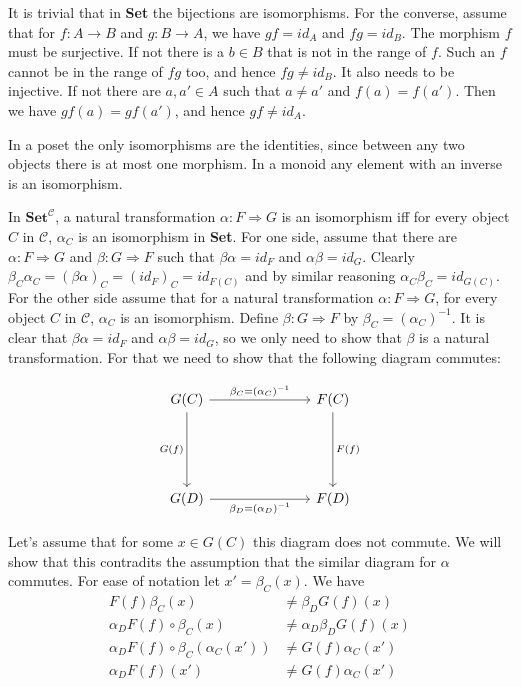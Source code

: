 It is trivial that in \textbf{Set} the bijections are isomorphisms. For the converse, assume that for $f:A\to B$ and $g:B\to A$, we have $gf=id_A$ and $fg=id_B$. The morphism $f$ must be surjective. If not there is a $b\in B$ that is not in the range of $f$. Such an $f$ cannot be in the range of $fg$ too, and hence $fg\neq id_B$. It also needs to be injective. If not there are $a,a'\in A$ such that $a\neq a'$ and $f(a)=f(a')$. Then we have $gf(a)=gf(a')$, and hence $gf\neq id_A$.

In a poset the only isomorphisms are the identities, since between any two objects there is at most one morphism. In a monoid any element with an inverse is an isomorphism.

In $\textbf{Set}^\mathcal{C}$, a natural transformation $\alpha:F\Rightarrow G$ is an isomorphism iff for every object $C$ in $\mathcal{C}$, $\alpha_C$ is an isomorphism in \textbf{Set}. For one side, assume that there are $\alpha:F\Rightarrow G$ and $\beta:G\Rightarrow F$ such that $\beta\alpha=id_F$ and $\alpha\beta=id_G$. Clearly $\beta_C\alpha_C=(\beta\alpha)_C=(id_F)_C=id_{F(C)}$ and by similar reasoning $\alpha_C\beta_C=id_{G(C)}$. For the other side assume that for a natural transformation $\alpha:F\Rightarrow G$, for every object $C$ in $\mathcal{C}$, $\alpha_C$ is an isomorphism. Define $\beta:G\Rightarrow F$ by $\beta_C=(\alpha_C)^{-1}$. It is clear that $\beta\alpha=id_F$ and $\alpha\beta=id_G$, so we only need to show that $\beta$ is a natural transformation.
For that we need to show that the following diagram commutes:

\[\begin{tikzcd}
	{G(C)} &&& {F(C)} \\
	\\
	\\
	{G(D)} &&& {F(D)}
	\arrow["{\beta_C=(\alpha_C)^{-1}}", from=1-1, to=1-4]
	\arrow["{F(f)}", from=1-4, to=4-4]
	\arrow["{G(f)}"', from=1-1, to=4-1]
	\arrow["{\beta_D=(\alpha_D)^{-1}}"', from=4-1, to=4-4]
\end{tikzcd}\]

Let's assume that for some $x\in G(C)$ this diagram does not commute. We will show that this contradits the assumption that the similar diagram for $\alpha$ commutes. For ease of notation let $x'=\beta_C(x)$. We have
\begin{align*}
F(f)\beta_C(x)&\neq\beta_DG(f)(x)\\
\alpha_DF(f)\circ\beta_C(x)&\neq\alpha_D\beta_DG(f)(x)\\
\alpha_DF(f)\circ\beta_C(\alpha_C(x'))&\neq G(f)\alpha_C(x')\\
\alpha_DF(f)(x')&\neq G(f)\alpha_C(x')
\end{align*}
